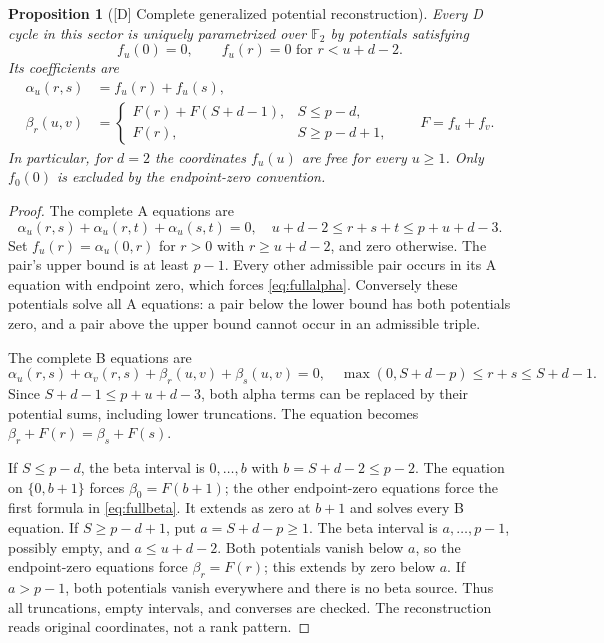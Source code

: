 \documentclass[11pt]{article}
\newtheorem{proposition}[theorem]{Proposition}
\theoremstyle{definition}
\theoremstyle{remark}
\begin{document}
\begin{proposition}[{[D]} Complete generalized potential reconstruction]\label{prop:complete-d}
Every D cycle in this sector is uniquely parametrized over $\mathbb F_2$
by potentials satisfying
\[
 f_u(0)=0,\qquad f_u(r)=0\text{ for }r<u+d-2.
\]
Its coefficients are
\begin{align}
 \alpha_u(r,s)&=f_u(r)+f_u(s),\label{eq:fullalpha}\\
 \beta_r(u,v)&=
 \begin{cases}
 F(r)+F(S+d-1),&S\leq p-d,\\
 F(r),&S\geq p-d+1,
 \end{cases}\qquad F=f_u+f_v.\label{eq:fullbeta}
\end{align}
In particular, for $d=2$ the coordinates $f_u(u)$ are free for every
$u\geq1$. Only $f_0(0)$ is excluded by the endpoint-zero convention.
\end{proposition}
\begin{proof}
The complete A equations are
\[
 \alpha_u(r,s)+\alpha_u(r,t)+\alpha_u(s,t)=0,
 \quad u+d-2\leq r+s+t\leq p+u+d-3.
\]
Set $f_u(r)=\alpha_u(0,r)$ for $r>0$ with $r\geq u+d-2$,
and zero otherwise. The pair's upper bound is at least $p-1$.
Every other admissible pair occurs in its A equation with endpoint zero,
which forces \eqref{eq:fullalpha}. Conversely these potentials solve
all A equations: a pair below the lower bound has both potentials zero,
and a pair above the upper bound cannot occur in an admissible triple.

The complete B equations are
\[
 \alpha_u(r,s)+\alpha_v(r,s)+\beta_r(u,v)+\beta_s(u,v)=0,
 \quad\max(0,S+d-p)\leq r+s\leq S+d-1.
\]
Since $S+d-1\leq p+u+d-3$, both alpha terms can be replaced by
their potential sums, including lower truncations. The equation becomes
$\beta_r+F(r)=\beta_s+F(s)$.

If $S\leq p-d$, the beta interval is $0,\ldots,b$ with
$b=S+d-2\leq p-2$. The equation on $\{0,b+1\}$ forces
$\beta_0=F(b+1)$; the other endpoint-zero equations force the first
formula in \eqref{eq:fullbeta}. It extends as zero at $b+1$ and solves
every B equation. If $S\geq p-d+1$, put $a=S+d-p\geq1$.
The beta interval is $a,\ldots,p-1$, possibly empty, and
$a\leq u+d-2$. Both potentials vanish below $a$, so the endpoint-zero
equations force $\beta_r=F(r)$; this extends by zero below $a$.
If $a>p-1$, both potentials vanish everywhere and there is no beta
source. Thus all truncations, empty intervals, and converses are checked.
The reconstruction reads original coordinates, not a rank pattern.
\end{proof}
\end{document}
